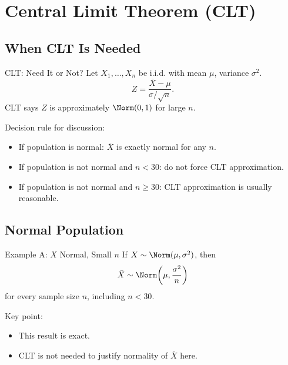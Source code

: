 \documentclass[aspectratio=169]{beamer}
\begin{document}
\section{Central Limit Theorem (CLT)}

\subsection{When CLT Is Needed}
\begin{frame}{CLT: Need It or Not?}
  Let \(X_1,\dots,X_n\) be i.i.d. with mean \(\mu\), variance \(\sigma^2\).
  \[
    Z=\frac{\bar{X}-\mu}{\sigma/\sqrt{n}}.
  \]
  CLT says \(Z\) is approximately \(\Norm(0,1)\) for large \(n\).

  \vspace{3pt}
  Decision rule for discussion:
  \begin{itemize}
    \item If population is normal: \(\bar{X}\) is exactly normal for any \(n\).
    \item If population is not normal and \(n<30\): do not force CLT approximation.
    \item If population is not normal and \(n\ge 30\): CLT approximation is usually reasonable.
  \end{itemize}
\end{frame}

\subsection{Normal Population}
\begin{frame}{Example A: \(X\) Normal, Small \(n\)}
  If \(X\sim\Norm(\mu,\sigma^2)\), then
  \[
    \bar{X}\sim\Norm\!\left(\mu,\frac{\sigma^2}{n}\right)
  \]
  for every sample size \(n\), including \(n<30\).

  \vspace{3pt}
  Key point:
  \begin{itemize}
    \item This result is exact.
    \item CLT is not needed to justify normality of \(\bar{X}\) here.
  \end{itemize}
\end{frame}
\end{document}
